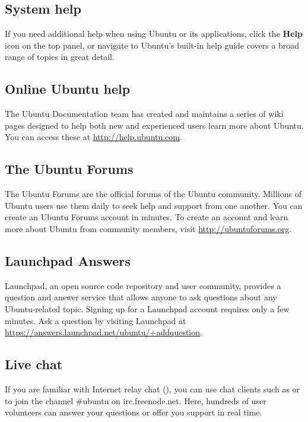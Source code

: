 \subsection{System help}

If you need additional help when using Ubuntu or its applications, click the \textbf{Help} icon on the top panel, or navigate to   Ubuntu's built-in help guide covers a broad range of topics in great detail.

\subsection{Online Ubuntu help}

The Ubuntu Documentation team has created and maintains a series of wiki pages designed to help both new and experienced users learn more about Ubuntu. You can access these at \url{http://help.ubuntu.com}.

\subsection{The Ubuntu Forums}

The Ubuntu Forums are the official forums of the Ubuntu community.  Millions of Ubuntu users use them daily to seek help and support from one another. You can create an Ubuntu Forums account in minutes. To create an account and learn more about Ubuntu from community members, visit \url{http://ubuntuforums.org}.

\subsection{Launchpad Answers}

Launchpad, an open source code repository and user community, provides a question and answer service that allows anyone to ask questions about any Ubuntu-related topic. Signing up for a Launchpad account requires only a few minutes. Ask a question by visiting Launchpad at \url{https://answers.launchpad.net/ubuntu/+addquestion}.

\subsection{Live chat}

If you are familiar with Internet relay chat (), you can use chat clients such as  or  to join the channel \#ubuntu on irc.freenode.net. Here, hundreds of user volunteers can answer your questions or offer you support in real time.

